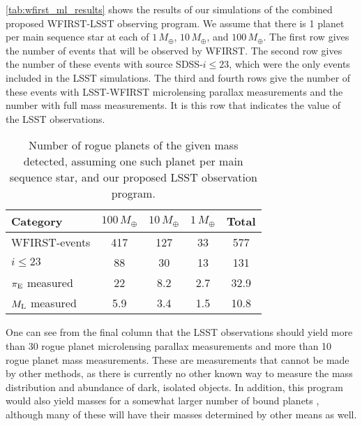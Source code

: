 \autoref{tab:wfirst_ml_results}
shows the results of our simulations of the combined proposed WFIRST-LSST
observing program. We assume that there is 1 planet per main sequence
star at each of $1\,M_\oplus$, $10\,M_\oplus$, and $100\,M_\oplus$.
The first row gives the number of events that will be
observed by WFIRST. The second row gives the number of these events
with source SDSS-$i \leq 23$, which were the only events included in the
LSST simulations. The third and fourth rows give the number of these events
with LSST-WFIRST microlensing parallax measurements and the number
with full mass measurements. It is this row that indicates the
value of the LSST observations.

\begin{table}
\begin{tabular}{lcccc}
Category & $100\,M_\oplus$ & $10\,M_\oplus$ & $1\,M_\oplus$ & Total \\
\hline
WFIRST-events    &   417   &         127    &         33    &  577  \\
$i \leq 23$      &    88   &          30    &         13    &  131  \\
$\pi_{\rm E}$ measured &    22   &           8.2  &          2.7  &   32.9 \\
$M_{\rm L}$ measured   &    5.9  &           3.4  &          1.5  &   10.8 \\
\end{tabular}
\caption{Number of rogue planets of the given mass detected, assuming
one such planet per main sequence star, and our proposed LSST observation
program.}
\label{tab:wfirst_ml_results}
\end{table}

One can see from the final column that the LSST observations should
yield more than 30 rogue planet microlensing parallax measurements and
more than 10 rogue planet mass measurements.
%
These are measurements that cannot be made by other methods, as there is
currently no other known way to measure the mass distribution and abundance
of dark, isolated objects.
%
In addition, this program would
also yield masses for a somewhat larger number of bound planets
\citep{2003ApJ...591L..53G}, although many of these will have their
masses determined by other means as well.

